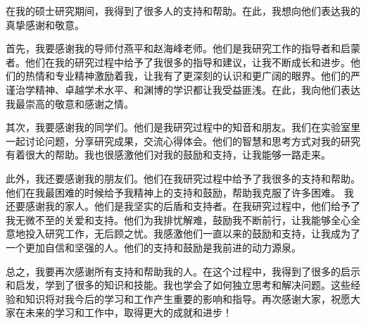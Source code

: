 \acknowledgments

在我的硕士研究期间，我得到了很多人的支持和帮助。在此，我想向他们表达我的真挚感谢和敬意。\par

首先，我要感谢我的导师付燕平和赵海峰老师。他们是我研究工作的指导者和启蒙者。他们在我的研究过程中给予了我很多的指导和建议，让我不断成长和进步。他们的热情和专业精神激励着我，让我有了更深刻的认识和更广阔的眼界。他们的严谨治学精神、卓越学术水平、和渊博的学识都让我受益匪浅。在此，我向他们表达我最崇高的敬意和感谢之情。

其次，我要感谢我的同学们。他们是我研究过程中的知音和朋友。我们在实验室里一起讨论问题，分享研究成果，交流心得体会。他们的智慧和思考方式对我的研究有着很大的帮助。我也很感激他们对我的鼓励和支持，让我能够一路走来。

此外，我还要感谢我的朋友们。他们在我研究过程中给予了我很多的支持和帮助。他们在我最困难的时候给予我精神上的支持和鼓励，帮助我克服了许多困难。
我还要感谢我的家人。他们是我坚实的后盾和支持者。在我研究过程中，他们给予了我无微不至的关爱和支持。他们为我排忧解难，鼓励我不断前行，让我能够全心全意地投入研究工作，无后顾之忧。我感激他们一直以来的鼓励和支持，让我成为了一个更加自信和坚强的人。他们的支持和鼓励是我前进的动力源泉。

总之，我要再次感谢所有支持和帮助我的人。在这个过程中，我得到了很多的启示和启发，学到了很多的知识和技能。我也学会了如何独立思考和解决问题。这些经验和知识将对我今后的学习和工作产生重要的影响和指导。再次感谢大家，祝愿大家在未来的学习和工作中，取得更大的成就和进步！
\par 


